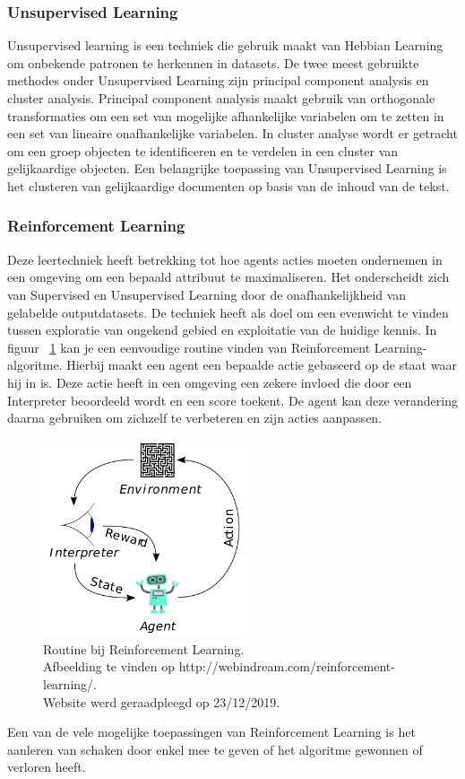 	\subsubsection{Unsupervised Learning} Unsupervised learning is een techniek die gebruik maakt van Hebbian Learning om onbekende patronen te herkennen in datasets. De twee meest gebruikte methodes onder Unsupervised Learning zijn principal component analysis en cluster analysis. Principal component analysis maakt gebruik van orthogonale transformaties om een set van mogelijke afhankelijke variabelen om te zetten in een set van lineaire onafhankelijke variabelen. In cluster analyse wordt er getracht om een groep objecten te identificeren en te verdelen in een cluster van gelijkaardige objecten. 
	Een belangrijke toepassing van Unsupervised Learning is het clusteren van gelijkaardige documenten op basis van de inhoud van de tekst.
	
	
	\subsubsection{Reinforcement Learning} Deze leertechniek heeft betrekking tot hoe agents acties moeten ondernemen in een omgeving om een bepaald attribuut te maximaliseren. Het onderscheidt zich van Supervised en Unsupervised Learning door de onafhankelijkheid van gelabelde outputdatasets. De techniek heeft als doel om een evenwicht te vinden tussen exploratie van ongekend gebied en exploitatie van de huidige kennis. In figuur ~\ref{fig:reinforcemntLearning} kan je een eenvoudige routine vinden van Reinforcement Learning-algoritme. Hierbij maakt een agent een bepaalde actie gebaseerd op de staat waar hij in is. Deze actie heeft in een omgeving een zekere invloed die door een Interpreter beoordeeld wordt en een score toekent. De agent kan deze verandering daarna gebruiken om zichzelf te verbeteren en zijn acties aanpassen. 
	\begin{figure}
		\centering
		\includegraphics[width=60mm]{afbeeldingen/Reinforcement_learning_diagram.PNG}
		\caption{Routine bij Reinforcement Learning. \\Afbeelding te vinden op http://webindream.com/reinforcement-learning/.\\ Website werd geraadpleegd op 23/12/2019.}
		\label{fig:reinforcemntLearning}
	\end{figure}
	Een van de vele mogelijke toepassingen van Reinforcement Learning is het aanleren van schaken door enkel mee te geven of het algoritme gewonnen of verloren heeft. 
	

